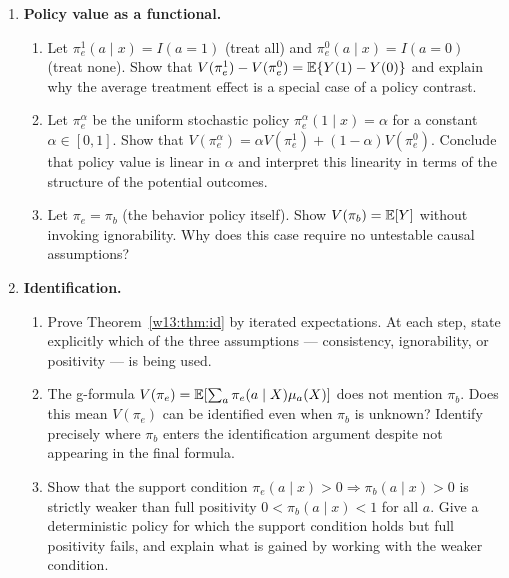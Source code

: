 \documentclass[master.tex]{subfiles}
\begin{document}
\begin{enumerate}

\item \textbf{Policy value as a functional.}
\begin{enumerate}
  \item Let $\pi_e^1(a\mid x)=I(a=1)$ (treat all) and
    $\pi_e^0(a\mid x)=I(a=0)$ (treat none).  Show that
    $V(\pi_e^1)-V(\pi_e^0)=\mathbb{E}\{Y(1)-Y(0)\}$ and explain why the
    average treatment effect is a special case of a policy contrast.
  \item Let $\pi_e^\alpha$ be the uniform stochastic policy
    $\pi_e^\alpha(1\mid x)=\alpha$ for a constant $\alpha\in[0,1]$.
    Show that $V(\pi_e^\alpha)=\alpha V(\pi_e^1)+(1-\alpha)V(\pi_e^0)$.
    Conclude that policy value is linear in $\alpha$ and interpret
    this linearity in terms of the structure of the potential outcomes.
  \item Let $\pi_e=\pi_b$ (the behavior policy itself).  Show
    $V(\pi_b)=\mathbb{E}[Y]$ without invoking ignorability.  Why does this
    case require no untestable causal assumptions?
\end{enumerate}

\item \textbf{Identification.}
\begin{enumerate}
  \item Prove Theorem~\ref{w13:thm:id} by iterated expectations.  At
    each step, state explicitly which of the three assumptions ---
    consistency, ignorability, or positivity --- is being used.
  \item The g-formula $V(\pi_e)=\mathbb{E}[\sum_a\pi_e(a\mid X)\mu_a(X)]$
    does not mention $\pi_b$.  Does this mean $V(\pi_e)$ can be
    identified even when $\pi_b$ is unknown?  Identify precisely
    where $\pi_b$ enters the identification argument despite not
    appearing in the final formula.
  \item Show that the support condition $\pi_e(a\mid x)>0\Rightarrow
    \pi_b(a\mid x)>0$ is strictly weaker than full positivity
    $0<\pi_b(a\mid x)<1$ for all $a$.  Give a deterministic policy
    for which the support condition holds but full positivity fails,
    and explain what is gained by working with the weaker condition.
\end{enumerate}


\end{enumerate}
\end{document}
